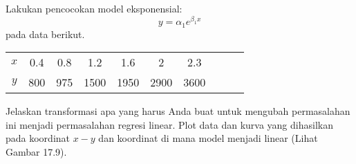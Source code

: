 \begin{soal}

Lakukan pencocokan model eksponensial:
\begin{equation*}
y = \alpha_{1} e^{\beta_{1}x}
\end{equation*}
pada data berikut.

{\centering
\begin{tabular}{|c|ccccccccc|}
\hline
$x$ & 0.4 & 0.8 & 1.2 & 1.6 & 2 & 2.3 \\
$y$ & 800 & 975 & 1500 & 1950 & 2900 & 3600 \\
\hline
\end{tabular}
\par}
Jelaskan transformasi apa yang harus Anda buat untuk mengubah permasalahan
ini menjadi permasalahan regresi linear.
Plot data dan kurva yang dihasilkan pada koordinat $x-y$ dan koordinat di mana
model menjadi linear (Lihat Gambar 17.9).
\end{soal}